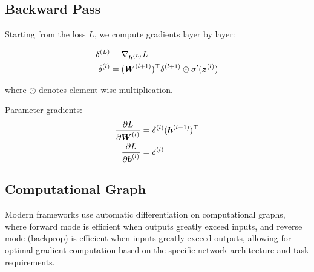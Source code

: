 \subsection{Backward Pass}

Starting from the loss $L$, we compute gradients layer by layer:

\begin{align}
\delta^{(L)} &= \nabla_{\boldsymbol{h}^{(L)}} L \\
\delta^{(l)} &= (\boldsymbol{W}^{(l+1)})^\top \delta^{(l+1)} \odot \sigma'(\boldsymbol{z}^{(l)})
\end{align}

where $\odot$ denotes element-wise multiplication.

Parameter gradients:
\begin{align}
\frac{\partial L}{\partial \boldsymbol{W}^{(l)}} &= \delta^{(l)} (\boldsymbol{h}^{(l-1)})^\top \\
\frac{\partial L}{\partial \boldsymbol{b}^{(l)}} &= \delta^{(l)}
\end{align}

\subsection{Computational Graph}

Modern frameworks use automatic differentiation on computational graphs, where forward mode is efficient when outputs greatly exceed inputs, and reverse mode (backprop) is efficient when inputs greatly exceed outputs, allowing for optimal gradient computation based on the specific network architecture and task requirements.


